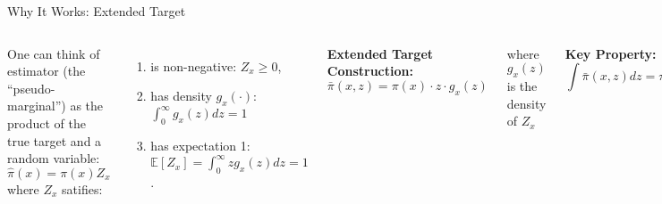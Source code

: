 \documentclass[aspectratio=169]{beamer}
\begin{document}
\begin{frame}{Why It Works: Extended Target}

    \begin{columns}
        One can think of estimator (the “pseudo-marginal”) as the product of the true target and a random variable:
            \begin{equation*}
            \hat{\pi}(x) = \pi(x) Z_x
            \end{equation*}
        where $Z_x$ satifies:
        \begin{enumerate}
            \item is non-negative: $Z_x \geq 0$,
            \item has density $g_x(·)$: $\int_0^{\infty} g_x(z)dz = 1$
            \item has expectation 1: $\mathbb{E}[Z_x] = \int_0^{\infty} z g_x(z) dz = 1$.
        \end{enumerate}

            \textbf{Extended Target Construction:}
            \begin{equation*}
            \bar{\pi}(x,z) = \pi(x) \cdot z \cdot g_x(z)
            \end{equation*}

            where $g_x(z)$ is the density of $Z_x$

            \vspace{0.5cm}
            \textbf{Key Property:}
            \begin{equation*}
            \int \bar{\pi}(x,z) dz = \pi(x)
            \end{equation*}

            \vspace{0.3cm}
            \textbf{Intuition:}
            \begin{itemize}
                \item Run exact MCMC on $(x,z)$ space
                \item Marginal in $x$ gives correct target
                \item $z$ represents the "noise" in estimates
            \end{itemize}
    \end{columns}
\end{frame}
\end{document}
